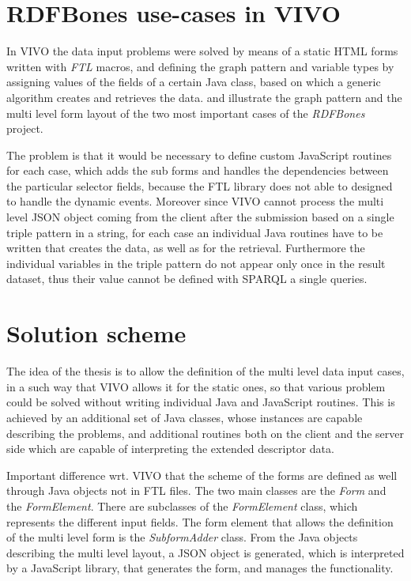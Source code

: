 \section{RDFBones use-cases in VIVO}

In VIVO the data input problems were solved by means of a static HTML forms written with \textit{FTL} macros, and defining the graph pattern and variable types by assigning values of the fields of a certain Java class, based on which a generic algorithm creates and retrieves the data.  and  illustrate the graph pattern and the multi level form layout of the two most important cases of the \textit{RDFBones} project. 



The problem is that it would be necessary to define custom JavaScript routines for each case, which adds the sub forms and handles the dependencies between the particular selector fields, because the FTL library does not able to designed to handle the dynamic events. Moreover since VIVO cannot process the multi level JSON object coming from the client after the submission based on a single triple pattern in a string, for each case an individual Java routines have to be written that creates the data, as well as for the retrieval. Furthermore the individual variables in the triple pattern do not appear only once in the result dataset, thus their value cannot be defined with SPARQL a single queries. 

\section{Solution scheme}

The idea of the thesis is to allow the definition of the multi level data input cases, in a such way that VIVO allows it for the static ones, so that various problem could be solved without writing individual Java and JavaScript routines. This is achieved by an additional set of Java classes, whose instances are capable describing the problems, and additional routines both on the client and the server side which are capable of interpreting the extended descriptor data.

Important difference wrt. VIVO that the scheme of the forms are defined as well through Java objects not in FTL files. The two main classes are the \textit{Form} and the \textit{FormElement}. There are subclasses of the \textit{FormElement} class, which represents the different input fields. The form element that allows the definition of the multi level form is the \textit{SubformAdder} class. From the Java objects describing the multi level layout, a JSON object is generated, which is interpreted by a JavaScript library, that generates the form, and manages the functionality.


